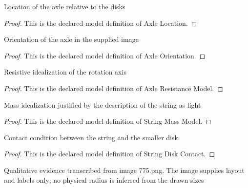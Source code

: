 \begin{definition}
  \label{def:physics:phyx-mini-0775:phyxminiproblems-problemphyxmini0775-axlelocation}
  Location of the axle relative to the disks
\end{definition}
\begin{proof}
  This is the declared model definition of Axle Location.
\end{proof}
\begin{definition}
  \label{def:physics:phyx-mini-0775:phyxminiproblems-problemphyxmini0775-axleorientation}
  Orientation of the axle in the supplied image
\end{definition}
\begin{proof}
  This is the declared model definition of Axle Orientation.
\end{proof}
\begin{definition}
  \label{def:physics:phyx-mini-0775:phyxminiproblems-problemphyxmini0775-axleresistancemodel}
  Resistive idealization of the rotation axis
\end{definition}
\begin{proof}
  This is the declared model definition of Axle Resistance Model.
\end{proof}
\begin{definition}
  \label{def:physics:phyx-mini-0775:phyxminiproblems-problemphyxmini0775-stringmassmodel}
  Mass idealization justified by the description of the string as light
\end{definition}
\begin{proof}
  This is the declared model definition of String Mass Model.
\end{proof}
\begin{definition}
  \label{def:physics:phyx-mini-0775:phyxminiproblems-problemphyxmini0775-stringdiskcontact}
  Contact condition between the string and the smaller disk
\end{definition}
\begin{proof}
  This is the declared model definition of String Disk Contact.
\end{proof}
\begin{definition}
  \label{def:physics:phyx-mini-0775:phyxminiproblems-problemphyxmini0775-weldeddiskpulleyfigure}
  Qualitative evidence transcribed from image 775.png. The image supplies layout and labels only; no physical radius is inferred from the drawn sizes
\end{definition}
